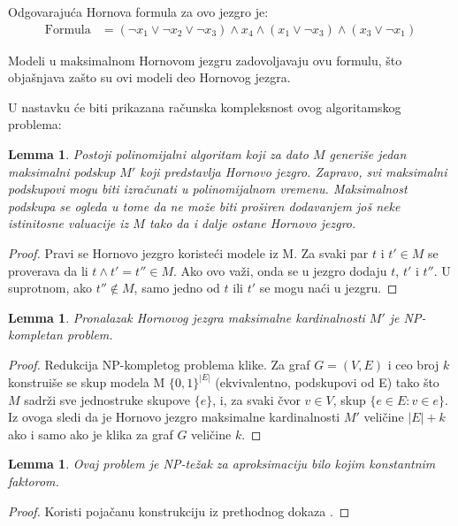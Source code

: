 \documentclass[12pt,oneside]{memoir}
\newtheorem{lemma}[theorem]{Lemma}
\begin{document}
Odgovarajuća Hornova formula za ovo jezgro je:
\begin{align*}
\text{Formula} &= (\neg x_1 \lor \neg x_2 \lor \neg x_3) \land x_4 \land (x_1 \lor \neg x_3) \land (x_3 \lor \neg x_1)
\end{align*}

Modeli u maksimalnom Hornovom jezgru zadovoljavaju ovu formulu, što objašnjava zašto su ovi modeli deo Hornovog jezgra.

U nastavku će biti prikazana računska kompleksnost ovog algoritamskog problema:

\begin{lemma}
    Postoji polinomijalni algoritam koji za dato $M$ generiše jedan maksimalni podskup $M'$ koji predstavlja Hornovo jezgro. Zapravo, svi maksimalni podskupovi mogu biti izračunati u polinomijalnom vremenu. Maksimalnost podskupa se ogleda u tome da ne može biti proširen dodavanjem još neke istinitosne valuacije iz $M$ tako da i dalje ostane Hornovo jezgro.
\end{lemma}

\begin{proof}
    Pravi se Hornovo jezgro koristeći modele iz M. Za svaki par $t$ i $t' \in M$ se proverava da li $t \land t' = t'' \in M$. Ako ovo važi, onda se u jezgro dodaju $t$, $t'$ i $t''$. U suprotnom, ako $t'' \notin M$, samo jedno od $t$ ili $t'$ se mogu naći u jezgru.
\end{proof}

\begin{lemma}
    Pronalazak Hornovog jezgra maksimalne kardinalnosti $M'$ je NP-kompletan problem.
\end{lemma}
 
\begin{proof}
    Redukcija NP-kompletog problema klike. Za graf $G=(V, E)$ i ceo broj $k$ konstruiše se skup modela M \subseteq $\{0,1\}^{|E|}$ (ekvivalentno, podskupovi od E) tako što $M$ sadrži sve jednostruke skupove $\{e\}$, i, za svaki čvor $v \in V$, skup $\{e \in E : v \in e\}$. Iz ovoga sledi da je Hornovo jezgro maksimalne kardinalnosti $M'$ veličine $|E|+k$ ako i samo ako je klika za graf $G$ veličine $k$.
\end{proof}
\begin{lemma}
    Ovaj problem je NP-težak za aproksimaciju bilo kojim konstantnim faktorom.
\end{lemma}

\begin{proof}
    Koristi pojačanu konstrukciju iz prethodnog dokaza \cite{doc3}.
\end{proof}
\end{document}
